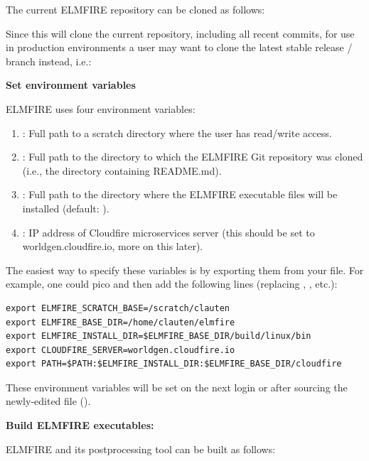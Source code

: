 The current ELMFIRE repository can be cloned as follows:


Since this will clone the current repository, including all recent commits, for use in production environments a user may want to clone the latest stable release / branch instead, i.e.:


\textbf{Set environment variables}

ELMFIRE uses four environment variables:

\begin{enumerate}
    \item {}: Full path to a scratch directory where the user has read/write access.
    \item {}: Full path to the directory to which the ELMFIRE Git repository was cloned (i.e., the directory containing README.md).
    \item {}: Full path to the directory where the ELMFIRE executable files will be installed (default: ).
    \item {}: IP address of Cloudfire microservices server (this should be set to worldgen.cloudfire.io, more on this later).
\end{enumerate}

The easiest way to specify these variables is by exporting them from your  file. For example, one could pico  and then add the following lines (replacing , , etc.):

\begin{verbatim}
export ELMFIRE_SCRATCH_BASE=/scratch/clauten
export ELMFIRE_BASE_DIR=/home/clauten/elmfire
export ELMFIRE_INSTALL_DIR=$ELMFIRE_BASE_DIR/build/linux/bin
export CLOUDFIRE_SERVER=worldgen.cloudfire.io
export PATH=$PATH:$ELMFIRE_INSTALL_DIR:$ELMFIRE_BASE_DIR/cloudfire
\end{verbatim}

These environment variables will be set on the next login or after sourcing the newly-edited file ().

\textbf{Build ELMFIRE executables:}

ELMFIRE and its postprocessing tool can be built as follows:

